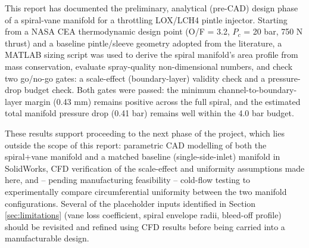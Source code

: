 \documentclass[11pt,a4paper]{article}
\begin{document}
This report has documented the preliminary, analytical (pre-CAD) design phase of a spiral-vane manifold for a throttling LOX/LCH4 pintle injector. Starting from a NASA CEA thermodynamic design point (O/F = 3.2, $P_c$ = 20 bar, 750 N thrust) and a baseline pintle/sleeve geometry adopted from the literature, a MATLAB sizing script was used to derive the spiral manifold's area profile from mass conservation, evaluate spray-quality non-dimensional numbers, and check two go/no-go gates: a scale-effect (boundary-layer) validity check and a pressure-drop budget check. Both gates were passed: the minimum channel-to-boundary-layer margin (0.43 mm) remains positive across the full spiral, and the estimated total manifold pressure drop (0.41 bar) remains well within the 4.0 bar budget.

These results support proceeding to the next phase of the project, which lies outside the scope of this report: parametric CAD modelling of both the spiral+vane manifold and a matched baseline (single-side-inlet) manifold in SolidWorks, CFD verification of the scale-effect and uniformity assumptions made here, and -- pending manufacturing feasibility -- cold-flow testing to experimentally compare circumferential uniformity between the two manifold configurations. Several of the placeholder inputs identified in Section \ref{sec:limitations} (vane loss coefficient, spiral envelope radii, bleed-off profile) should be revisited and refined using CFD results before being carried into a manufacturable design.
\end{document}
